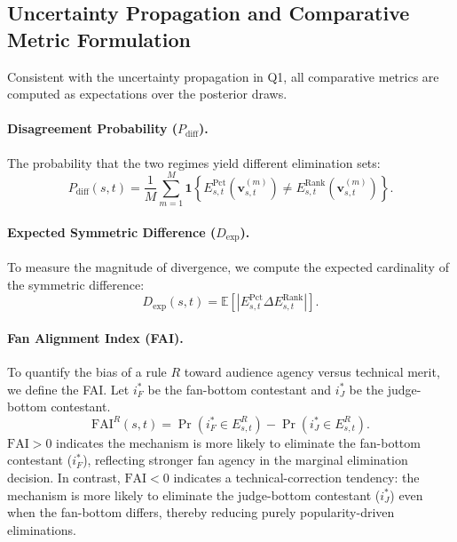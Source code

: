 \subsection{Uncertainty Propagation and Comparative Metric Formulation }
\label{sec:q2_metrics}

Consistent with the uncertainty propagation in Q1, all comparative metrics are computed as expectations over the posterior draws.

\paragraph{Disagreement Probability ($P_{\mathrm{diff}}$).}
The probability that the two regimes yield different elimination sets:
\begin{equation}
    P_{\mathrm{diff}}(s,t) = \frac{1}{M} \sum_{m=1}^M \mathbf{1}\left\{ E_{s,t}^{\mathrm{Pct}}(\mathbf{v}^{(m)}_{s,t}) \neq E_{s,t}^{\mathrm{Rank}}(\mathbf{v}^{(m)}_{s,t}) \right\}.
\end{equation}

\paragraph{Expected Symmetric Difference ($D_{\mathrm{exp}}$).}
To measure the magnitude of divergence, we compute the expected cardinality of the symmetric difference:
\begin{equation}
    D_{\mathrm{exp}}(s,t) = \mathbb{E}\left[ \left| E_{s,t}^{\mathrm{Pct}} \Delta E_{s,t}^{\mathrm{Rank}} \right| \right].
\end{equation}

\paragraph{Fan Alignment Index (FAI).}
To quantify the bias of a rule $R$ toward audience agency versus technical merit, we define the FAI. Let $i_F^*$ be the fan-bottom contestant and $i_J^*$ be the judge-bottom contestant.
\begin{equation}
    \mathrm{FAI}^R(s,t) = \Pr(i_F^* \in E^R_{s,t}) - \Pr(i_J^* \in E^R_{s,t}).
\end{equation}
$\mathrm{FAI} > 0$ indicates the mechanism is more likely to eliminate the fan-bottom contestant ($i_F^*$), reflecting stronger fan agency in the marginal elimination decision. In contrast, $\mathrm{FAI} < 0$ indicates a technical-correction tendency: the mechanism is more likely to eliminate the judge-bottom contestant ($i_J^*$) even when the fan-bottom differs, thereby reducing purely popularity-driven eliminations.


